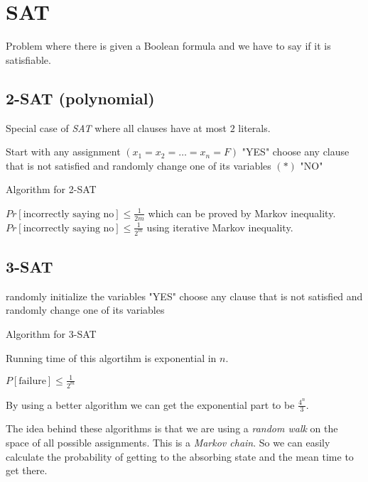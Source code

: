 \section{SAT}

Problem where there is given a Boolean formula and we have to say if it is satisfiable.

\subsection{2-SAT (polynomial)}

Special case of \textit{SAT} where all clauses have at most $2$ literals.


\begin{algorithm}[!ht]
	\begin{algorithmic}[1]
		\State Start with any assignment $(x_{1} = x_{2} = \dots = x_{n} = F)$
				\State \Return "YES"
			\Else \State choose any clause that is not satisfied and randomly change one of its variables $(\ast)$
			\EndIf
		\EndWhile
		\State \Return "NO"
	\end{algorithmic}
	\caption{Algorithm for 2-SAT}
\end{algorithm}

$Pr[\text{incorrectly saying no}]  \leq \frac{1}{2m}$ which can be proved by Markov inequality. $Pr[\text{incorrectly saying no}]  \leq \frac{1}{2^m}$ using iterative Markov inequality.

\subsection{3-SAT}

\begin{algorithm}[!ht]
	\begin{algorithmic}[1]
				\State randomly initialize the variables
					\State \Return "YES"
				\Else
					\State choose any clause that is not satisfied and randomly change one of its variables
				\EndIf
			\EndWhile
		\EndWhile
	\end{algorithmic}
	\caption{Algorithm for 3-SAT}
\end{algorithm}

Running time of this algortihm is exponential in $n$.

$P[\text{failure}] \leq \frac{1}{2^m}$

By using a better algorithm we can get the exponential part to be $\frac{4^n}{3}$.

The idea behind these algorithms is that we are using a \textit{random walk} on the space of all possible assignments. This is a \textit{Markov chain}. So we can easily calculate the probability of getting to the absorbing state and the mean time to get there.
